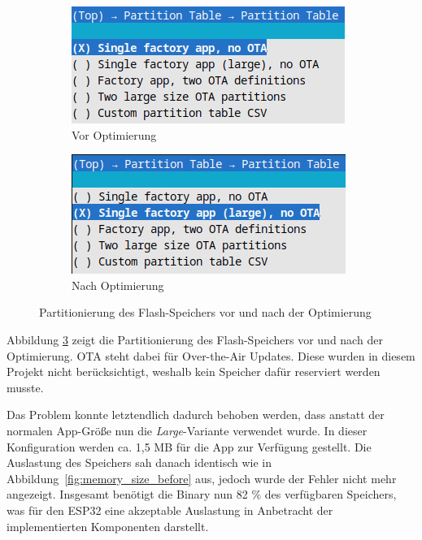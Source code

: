 \begin{figure}[H]
    \centering

    \begin{subfigure}[b]{0.40\textwidth}
        \centering
        \includegraphics[width=\textwidth]{images/partition_table_before.png}
        \caption{Vor Optimierung}
        \label{fig:partition_table_before}
    \end{subfigure}
    \hspace{0.05\textwidth} %
    \begin{subfigure}[b]{0.40\textwidth}
        \centering
        \includegraphics[width=\textwidth]{images/partition_table_after.png}
        \caption{Nach Optimierung}
        \label{fig:partition_table_after}
    \end{subfigure}

    \caption{Partitionierung des Flash-Speichers vor und nach der Optimierung}
    \label{fig:partition_table}
\end{figure}

Abbildung \ref{fig:partition_table} zeigt die Partitionierung des Flash-Speichers vor und nach der Optimierung. OTA steht dabei für Over-the-Air Updates. Diese wurden in diesem Projekt nicht berücksichtigt, weshalb kein Speicher dafür reserviert werden musste. \newline

Das Problem konnte letztendlich dadurch behoben werden, dass anstatt der normalen App-Größe nun die \textit{Large}-Variante verwendet wurde. In dieser Konfiguration werden ca. 1,5 MB für die App zur Verfügung gestellt. Die Auslastung des Speichers sah danach identisch wie in Abbildung~\ref{fig:memory_size_before} aus, jedoch wurde der Fehler nicht mehr angezeigt. Insgesamt benötigt die Binary nun 82 \% des verfügbaren Speichers, was für den ESP32 eine akzeptable Auslastung in Anbetracht der implementierten Komponenten darstellt. \newline

